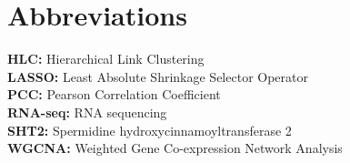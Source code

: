 \section*{Abbreviations}
\label{sec.abrev}
\textbf{HLC:} Hierarchical Link Clustering\\
\textbf{LASSO:} Least Absolute Shrinkage Selector Operator\\
\textbf{PCC:} Pearson Correlation Coefficient\\
\textbf{RNA-seq:} RNA sequencing\\
\textbf{SHT2:} Spermidine hydroxycinnamoyltransferase 2\\
\textbf{WGCNA:} Weighted Gene Co-expression Network Analysis